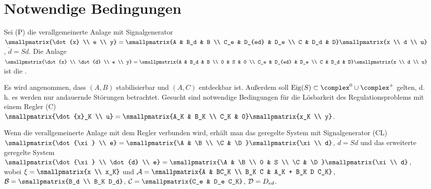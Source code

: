 \section{%
    Notwendige Bedingungen%
}

Sei (P) die verallgemeinerte Anlage mit Signalgenerator\\
$\smallpmatrix{\dot{x} \\ e \\ y} = \smallpmatrix{A & B_d & B \\ C_e & D_{ed} & D_e \\ C & D_d & D}
\smallpmatrix{x \\ d \\ u}$, $\dot{d} = Sd$.
Die Anlage
$\smallpmatrix{\dot{x} \\ \dot{d} \\ e \\ y} =
\smallpmatrix{A & B_d & B \\ 0 & S & 0 \\ C_e & D_{ed} & D_e \\ C & D_d & D}
\smallpmatrix{x \\ d \\ u}$
ist die .

Es wird angenommen, dass $(A, B)$ stabilisierbar und $(A, C)$ entdeckbar ist.
Außerdem soll $\Eig(S) \subset \complex^0 \cup \complex^+$ gelten, d.\,h. es werden nur
andauernde Störungen betrachtet.
Gesucht sind notwendige Bedingungen für die Lösbarkeit des Regulationsproblems mit einem
Regler (C)\\
$\smallpmatrix{\dot{x}_K \\ u} = \smallpmatrix{A_K & B_K \\ C_K & 0} \smallpmatrix{x_K \\ y}$.

Wenn die verallgemeinerte Anlage mit dem Regler verbunden wird,
erhält man das geregelte System
mit Signalgenerator (CL)\\
$\smallpmatrix{\dot{\xi} \\ e} = \smallpmatrix{\A & \B \\ \C & \D} \smallpmatrix{\xi \\ d}$,
$\dot{d} = Sd$
und das erweiterte geregelte System
$\smallpmatrix{\dot{\xi} \\ \dot{d} \\ e} = \smallpmatrix{\A & \B \\ 0 & S \\ \C & \D}
\smallpmatrix{\xi \\ d}$,\\
wobei $\xi = \smallpmatrix{x \\ x_K}$ und
$\A = \smallpmatrix{A & BC_K \\ B_K C & A_K + B_K D C_K}$,
$\B = \smallpmatrix{B_d \\ B_K D_d}$,
$\C = \smallpmatrix{C_e & D_e C_K}$,
$\mathcal{D} = D_{ed}$.

